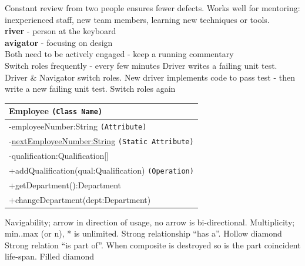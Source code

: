 \documentclass[number]{assignment}
\begin{document}
\begin{landscape}
\begin{multicols}{3}
Constant review from two people ensures fewer defects. Works well for mentoring: inexperienced staff, new team members, learning new techniques or tools.\\
\textbf{river} - person at the keyboard\\
\textbf{avigator} - focusing on design\\
Both need to be actively engaged - keep a running commentary\\
Switch roles frequently - every few minutes
Driver writes a failing unit test. Driver \& Navigator switch roles. New driver implements code to pass test - then write a new failing unit test. Switch roles again
\begin{tabular}{|l|}
\hline
Employee \texttt{(Class Name)}\\\hline
-employeeNumber:String \texttt{(Attribute)}\\
-\underline{nextEmployeeNumber:String} \texttt{(Static Attribute)}\\
-qualification:Qualification[]\\\hline
+addQualification(qual:Qualification) \texttt{(Operation)}\\
+getDepartment():Department\\
+changeDepartment(dept:Department)\\\hline
\end{tabular}
Navigability; arrow in direction of usage, no arrow is bi-directional. Multiplicity; min..max (or n), * is unlimited.
Strong relationship ``has a''. Hollow diamond
Strong relation ``is part of''. When composite is destroyed so is the part coincident life-span. Filled diamond

\end{multicols}
\end{landscape}
\end{document}
